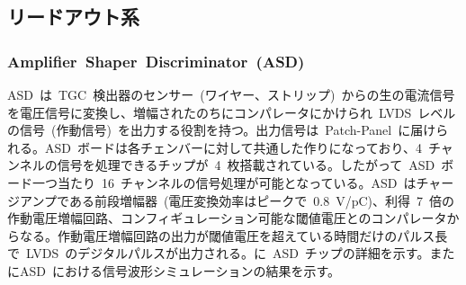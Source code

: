 \subsection{リードアウト系}
\subsubsection{Amplifier~Shaper~Discriminator~(ASD)~}
\label{subsubsec:ASD}
ASD~は~TGC~検出器のセンサー~(ワイヤー、ストリップ)~からの生の電流信号を電圧信号に変換し、増幅されたのちにコンパレータにかけられ~LVDS~レベルの信号~(作動信号)~を出力する役割を持つ。出力信号は~Patch-Panel~に届けられる。ASD~ボードは各チェンバーに対して共通した作りになっており、4~チャンネルの信号を処理できるチップが~4~枚搭載されている。したがって~ASD~ボード一つ当たり~16~チャンネルの信号処理が可能となっている。ASD~はチャージアンプである前段増幅器~(電圧変換効率はピークで~0.8~V/pC)、利得~7~倍の作動電圧増幅回路、コンフィギュレーション可能な閾値電圧とのコンパレータからなる。作動電圧増幅回路の出力が閾値電圧を超えている時間だけのパルス長で~LVDS~のデジタルパルスが出力される。に~ASD~チップの詳細を示す。またにASD~における信号波形シミュレーションの結果を示す。

